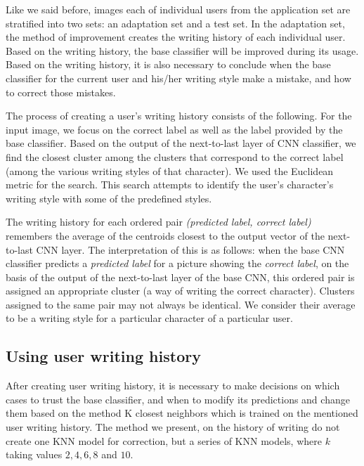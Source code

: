 \documentclass{article}
\begin{document}
Like we said before, images each of individual users from the application set are stratified into two sets: an adaptation set and a test set. %
In the adaptation set, the method of improvement creates the writing history of each individual user. 
Based on the writing history, the base classifier will be improved during its usage. 
Based on the writing history, it is also necessary to conclude when the base classifier for the current user and his/her writing style make a mistake, and how to correct those mistakes. 

The process of creating a user's writing history consists of the following. 
For the input image, we focus on the correct label as well as the label provided by the base classifier. 
Based on the output of the next-to-last layer of CNN classifier, we find the closest cluster among the clusters that correspond to the correct label (among the various writing styles of that character). 
We used the Euclidean metric for the search. %
This search attempts to identify the user's character's writing style with some of the predefined styles.  

The writing history for each ordered pair \textit{(predicted label, correct label)} remembers the average of the centroids closest to the output vector of the next-to-last CNN layer. 
The interpretation of this is as follows: when the base CNN classifier predicts %
 a \textit{predicted label} for a picture showing the \textit{correct label}, 
on the basis of the output of the next-to-last layer of the base CNN, this ordered pair is assigned an appropriate cluster (a way of writing the correct character). 
Clusters assigned to the same pair may not always be identical. 
We consider their average to be a writing style for a particular character of a particular user. 

\subsection{Using user writing history}

After creating user writing history, it is necessary to make decisions on which cases to trust the base classifier, and when to modify its predictions and change them based on the method K closest neighbors 
which is trained on the mentioned user writing history. 
The method we present, on the history of writing do not create one KNN model for correction, but a series of KNN models, where $k$ taking values $2, 4, 6, 8$ and $10$. 
\end{document}
